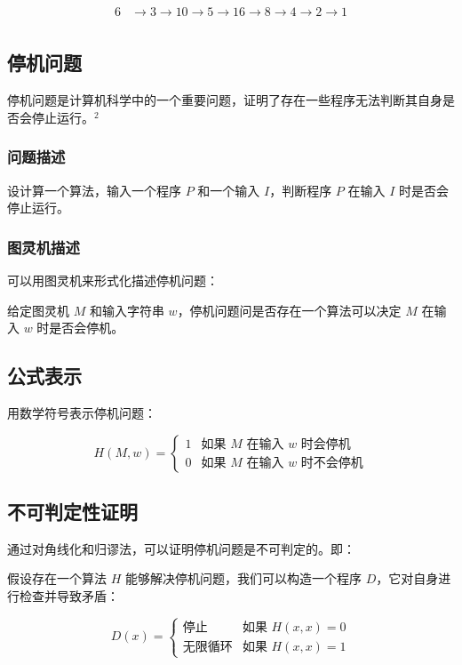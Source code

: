 \documentclass[UTF-8,a4paper,9pt]{article}
\begin{document}
\[
  \begin{aligned}
    6 & \rightarrow 3 \rightarrow 10 \rightarrow 5 \rightarrow 16 \rightarrow 8 \rightarrow 4 \rightarrow 2 \rightarrow 1 \\
  \end{aligned} \tag{3}
\]


\subsection{停机问题}

停机问题是计算机科学中的一个重要问题，证明了存在一些程序无法判断其自身是否会停止运行。$^2$

\subsubsection*{问题描述}
设计算一个算法，输入一个程序 $P$ 和一个输入 $I$，判断程序 $P$ 在输入 $I$ 时是否会停止运行。

\subsubsection*{图灵机描述}
可以用图灵机来形式化描述停机问题：

给定图灵机 $M$ 和输入字符串 $w$，停机问题问是否存在一个算法可以决定 $M$ 在输入 $w$ 时是否会停机。

\subsection*{公式表示}
用数学符号表示停机问题：

\[
  H(M, w) =
  \begin{cases}
    1 & \text{如果 } M \text{ 在输入 } w \text{ 时会停机}  \\
    0 & \text{如果 } M \text{ 在输入 } w \text{ 时不会停机}
  \end{cases}
\]

\subsection*{不可判定性证明}
通过对角线化和归谬法，可以证明停机问题是不可判定的。即：

假设存在一个算法 $H$ 能够解决停机问题，我们可以构造一个程序 $D$，它对自身进行检查并导致矛盾：

\[
  D(x) =
  \begin{cases}
    \text{停止}   & \text{如果 } H(x, x) = 0 \\
    \text{无限循环} & \text{如果 } H(x, x) = 1
  \end{cases}
\]
\end{document}
